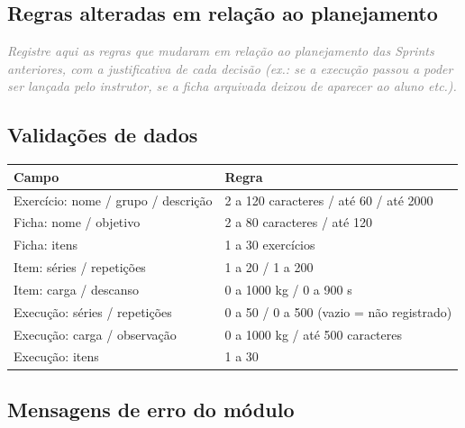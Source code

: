 \documentclass[11pt,a4paper,final]{article}
\newcommand{\preencher}[1]{\textit{\textcolor{gray}{#1}}}
\begin{document}
\subsection{Regras alteradas em relação ao planejamento}

\preencher{Registre aqui as regras que mudaram em relação ao planejamento das Sprints anteriores, com a
justificativa de cada decisão (ex.: se a execução passou a poder ser lançada pelo instrutor, se a ficha
arquivada deixou de aparecer ao aluno etc.).}

\subsection{Validações de dados}

\begin{xltabular}{\textwidth}{l Y}
  \toprule
  \textbf{Campo} & \textbf{Regra} \\
  \midrule
  \endhead
  Exercício: nome / grupo / descrição & 2 a 120 caracteres / até 60 / até 2000 \\
  Ficha: nome / objetivo               & 2 a 80 caracteres / até 120 \\
  Ficha: itens                         & 1 a 30 exercícios \\
  Item: séries / repetições            & 1 a 20 / 1 a 200 \\
  Item: carga / descanso               & 0 a 1000 kg / 0 a 900 s \\
  Execução: séries / repetições        & 0 a 50 / 0 a 500 (vazio = não registrado) \\
  Execução: carga / observação         & 0 a 1000 kg / até 500 caracteres \\
  Execução: itens                      & 1 a 30 \\
  \bottomrule
\end{xltabular}

\subsection{Mensagens de erro do módulo}
\end{document}
